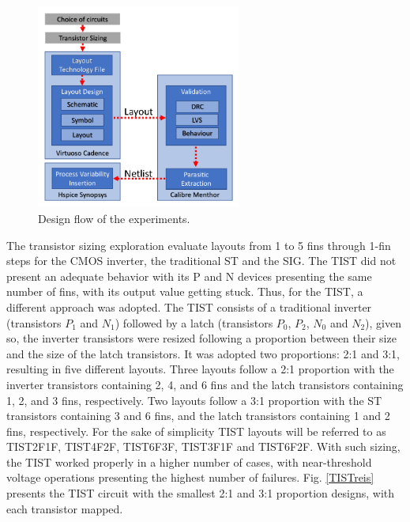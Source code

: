 \documentclass[diss,pgmicro,english]{iiufrgs}
\begin{document}
\begin{figure}[]
\centering
\includegraphics[width=0.6\textwidth, trim={0cm 0cm 0cm 0cm},clip]{designFlow.pdf}
\caption{Design flow of the experiments.}
\label{DesignFlow}
\end{figure}

The transistor sizing exploration evaluate layouts from 1 to 5 fins through 1-fin steps for the CMOS inverter, the traditional ST and the SIG. The TIST did not present an adequate behavior with its P and N devices presenting the same number of fins, with its output value getting stuck. Thus, for the TIST, a different approach was adopted. The TIST consists of a traditional inverter (transistors $P_1$ and $N_1$) followed by a latch (transistors $P_0$, $P_2$, $N_0$ and $N_2$), given so, the inverter transistors were resized following a proportion between their size and the size of the latch transistors. It was adopted two proportions: 2:1 and 3:1, resulting in five different layouts. Three layouts follow a 2:1 proportion with the inverter transistors containing 2, 4, and 6 fins and the latch transistors containing 1, 2, and 3 fins, respectively. Two layouts follow a 3:1 proportion with the ST transistors containing 3 and 6 fins, and the latch transistors containing 1 and 2 fins, respectively. For the sake of simplicity TIST layouts will be referred to as TIST2F1F, TIST4F2F, TIST6F3F, TIST3F1F and TIST6F2F. With such sizing, the TIST worked properly in a higher number of cases, with near-threshold voltage operations presenting the highest number of failures. Fig. \ref{TISTreis} presents the TIST circuit with the smallest 2:1 and 3:1 proportion designs, with each transistor mapped.
\end{document}
